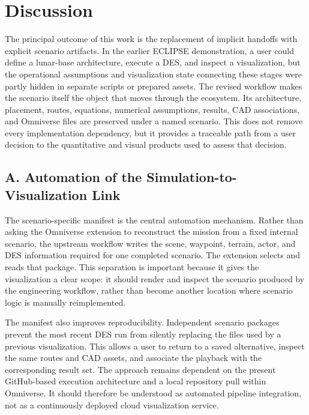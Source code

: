 
\section{Discussion}

The principal outcome of this work is the replacement of implicit handoffs with explicit scenario artifacts. In the earlier ECLIPSE demonstration, a user could define a lunar-base architecture, execute a DES, and inspect a visualization, but the operational assumptions and visualization state connecting these stages were partly hidden in separate scripts or prepared assets. The revised workflow makes the scenario itself the object that moves through the ecosystem. Its architecture, placement, routes, equations, numerical assumptions, results, CAD associations, and Omniverse files are preserved under a named scenario. This does not remove every implementation dependency, but it provides a traceable path from a user decision to the quantitative and visual products used to assess that decision.

\subsection{A. Automation of the Simulation-to-Visualization Link}

The scenario-specific manifest is the central automation mechanism. Rather than asking the Omniverse extension to reconstruct the mission from a fixed internal scenario, the upstream workflow writes the scene, waypoint, terrain, actor, and DES information required for one completed scenario. The extension selects and reads that package. This separation is important because it gives the visualization a clear scope: it should render and inspect the scenario produced by the engineering workflow, rather than become another location where scenario logic is manually reimplemented.

The manifest also improves reproducibility. Independent scenario packages prevent the most recent DES run from silently replacing the files used by a previous visualization. This allows a user to return to a saved alternative, inspect the same routes and CAD assets, and associate the playback with the corresponding result set. The approach remains dependent on the present GitHub-based execution architecture and a local repository pull within Omniverse. It should therefore be understood as automated pipeline integration, not as a continuously deployed cloud visualization service.

